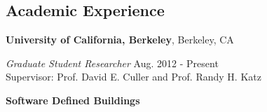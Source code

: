 \documentclass[margin,line]{res}
\newenvironment{list1}{
  \begin{list}{\ding{113}}{
      \setlength{\itemsep}{0in}
      \setlength{\parsep}{0in} \setlength{\parskip}{0in}
      \setlength{\topsep}{0in} \setlength{\partopsep}{0in}
      \setlength{\leftmargin}{0.17in}}}{\end{list}}
\newenvironment{list2}{
  \begin{list}{$\bullet$}{
      \setlength{\itemsep}{0in}
      \setlength{\parsep}{0in} \setlength{\parskip}{0in}
      \setlength{\topsep}{0in} \setlength{\partopsep}{0in}
      \setlength{\leftmargin}{0.2in}}}{\end{list}}
\begin{document}
\begin{resume}
%
%
%
%
%
%
    \section{\sc Academic Experience}

      {\bf University of California, Berkeley}, Berkeley, CA

      \vspace{-.3cm}
      {\em Graduate Student Researcher} \hfill Aug. 2012 - Present\\
      Supervisor: Prof. David E. Culler and Prof. Randy H. Katz\\

      \vspace*{-.1in}
      \begin{list1}
        \item[] {\bf Software Defined Buildings}\\
      \end{list1}


\end{resume}
\end{document}
